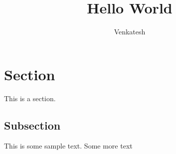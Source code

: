 \documentclass[12pt]{article}
\title{Hello World}
\author{Venkatesh}
\begin{document}
\maketitle
\section{Section}
This is a section.
\subsection{Subsection}
This is some sample text. Some more text
\end{document}
